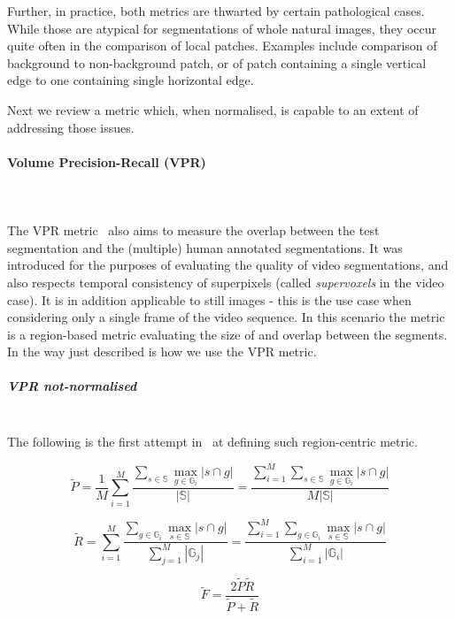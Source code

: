 Further, in practice, both metrics are thwarted by certain pathological cases. While those are atypical for segmentations of whole natural images, they occur quite often in the comparison of local patches. Examples include comparison of background to non-background patch, or of patch containing a single vertical edge to one containing single horizontal edge. 

Next we review a metric which, when normalised, is capable to an extent of addressing those issues.

\paragraph{Volume Precision-Recall (VPR)}\mbox{}\\\mbox{}\\
\label{par:ch4-VPR-maths}
The VPR metric~\cite{Galasso13} also aims to measure the overlap between the test segmentation and the (multiple) human annotated segmentations. It was introduced for the purposes of evaluating the quality of video segmentations, and also respects temporal consistency of superpixels (called \textit{supervoxels} in the video case). It is in addition applicable to %
still images - this is the use case when considering only a single frame of the video sequence. In this scenario the metric is a region-based metric evaluating the size of and overlap between the segments. 
In the way just described is how we use the VPR metric.

\subparagraph{VPR not-normalised}\mbox{}\\
The following is the first attempt in~\cite{Galasso13} at defining such region-centric metric.

\[
\tilde{P}=\frac{1}{M}\sum\limits _{i=1}^{M}\frac{\sum\limits _{s\in\mathbb{S}}\max\limits _{g\in\mathbb{G}_{i}}\left|s\cap g\right|}{\left|\mathbb{S}\right|}=\frac{\sum\limits _{i=1}^{M}\sum\limits _{s\in\mathbb{S}}\max\limits _{g\in\mathbb{G}_{i}}\left|s\cap g\right|}{M\left|\mathbb{S}\right|}
\]

\[
\tilde{R}=\sum\limits _{i=1}^{M}\frac{\sum\limits _{g\in\mathbb{G}_{i}}\max\limits _{s\in\mathbb{S}}\left|s\cap g\right|}{\sum\limits _{j=1}^{M}\left|\mathbb{G}_{j}\right|}=\frac{\sum\limits _{i=1}^{M}\sum\limits _{g\in\mathbb{G}_{i}}\max\limits _{s\in\mathbb{S}}\left|s\cap g\right|}{\sum\limits _{i=1}^{M}\left|\mathbb{G}_{i}\right|}
\]


\[
\tilde{F}=\frac{2\tilde{P}\tilde{R}}{\tilde{P}+\tilde{R}}
\]

